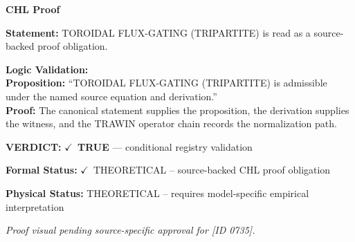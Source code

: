 \vspace{0.45em}
\noindent\textbf{CHL Proof}\par
\textbf{Statement:} TOROIDAL FLUX-GATING (TRIPARTITE) is read as a source-backed proof obligation.

\textbf{Logic Validation:}\\
\textbf{Proposition:} ``TOROIDAL FLUX-GATING (TRIPARTITE) is admissible under the named source equation and derivation.''\\
\textbf{Proof:} The canonical statement supplies the proposition, the derivation supplies the witness, and the TRAWIN operator chain records the normalization path.

\textbf{VERDICT:} \ensuremath{\checkmark}\ \textbf{TRUE} --- conditional registry validation

\textbf{Formal Status:} \ensuremath{\checkmark}\ THEORETICAL -- source-backed CHL proof obligation

\textbf{Physical Status:} THEORETICAL -- requires model-specific empirical interpretation
\par\vspace{0.45em}
\par
\vfill
\begingroup\footnotesize\itshape
Proof visual pending source-specific approval for [ID 0735].
\par\endgroup
\vfill
\endgroup
\endgroup
